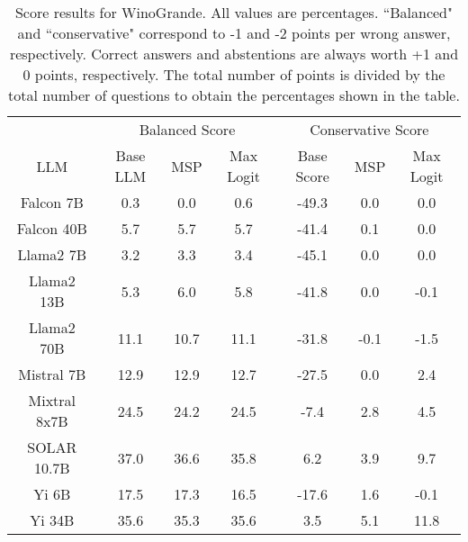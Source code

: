 \renewcommand\arraystretch{1.2}
\begin{table*}
\centering
\begin{tabular}{c|c|c|c|c|c|c}
& \multicolumn{3}{c|}{Balanced Score} & \multicolumn{3}{c}{Conservative Score} \\ 
LLM & Base LLM & MSP & Max Logit & Base Score & MSP & Max Logit\\ \hline
Falcon 7B & 0.3 & 0.0 & 0.6 & -49.3 & 0.0 & 0.0\\
Falcon 40B & 5.7 & 5.7 & 5.7 & -41.4 & 0.1 & 0.0\\
Llama2 7B & 3.2 & 3.3 & 3.4 & -45.1 & 0.0 & 0.0\\
Llama2 13B & 5.3 & 6.0 & 5.8 & -41.8 & 0.0 & -0.1\\
Llama2 70B & 11.1 & 10.7 & 11.1 & -31.8 & -0.1 & -1.5\\
Mistral 7B & 12.9 & 12.9 & 12.7 & -27.5 & 0.0 & 2.4\\
Mixtral 8x7B & 24.5 & 24.2 & 24.5 & -7.4 & 2.8 & 4.5\\
SOLAR 10.7B & 37.0 & 36.6 & 35.8 & 6.2 & 3.9 & 9.7\\
Yi 6B & 17.5 & 17.3 & 16.5 & -17.6 & 1.6 & -0.1\\
Yi 34B & 35.6 & 35.3 & 35.6 & 3.5 & 5.1 & 11.8\\
\hline
\end{tabular}
\caption{Score results for WinoGrande. All values are percentages. ``Balanced" and ``conservative" correspond to -1 and -2 points per wrong answer, respectively. Correct answers and abstentions are always worth +1 and 0 points, respectively. The total number of points is divided by the total number of questions to obtain the percentages shown in the table.}
\label{tab:winogrande_score}
\end{table*}
